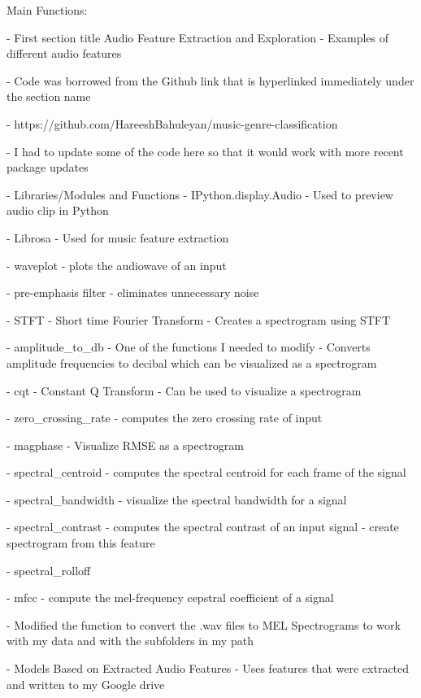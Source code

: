 Main Functions:

	- First section title Audio Feature Extraction and Exploration
		- Examples of different audio features

		- Code was borrowed from the Github link that is hyperlinked immediately under the section name

		- https://github.com/HareeshBahuleyan/music-genre-classification

		- I had to update some of the code here so that it would work with more recent package updates

		- Libraries/Modules and Functions
			- IPython.display.Audio
				- Used to preview audio clip in Python

			- Librosa
				- Used for music feature extraction

				- waveplot
					- plots the audiowave of an input

				- pre-emphasis filter
					- eliminates unnecessary noise

				- STFT - Short time Fourier Transform
					- Creates a spectrogram using STFT

				- amplitude_to_db
					- One of the functions I needed to modify
					- Converts amplitude frequencies to decibal which can be visualized as a spectrogram

				- cqt
					- Constant Q Transform
					- Can be used to visualize a spectrogram

				- zero_crossing_rate
					- computes the zero crossing rate of input

				- magphase
					- Visualize RMSE as a spectrogram

				- spectral_centroid
					- computes the spectral centroid for each frame of the signal

				- spectral_bandwidth
					- visualize the spectral bandwidth for a signal

				- spectral_contrast
					- computes the spectral contrast of an input signal
					- create spectrogram from this feature

				- spectral_rolloff

				- mfcc
					- compute the mel-frequency cepstral coefficient of a signal

			- Modified the function to convert the .wav files to MEL Spectrograms to work with my data and with the subfolders in my path

	- Models Based on Extracted Audio Features
		- Uses features that were extracted and written to my Google drive

